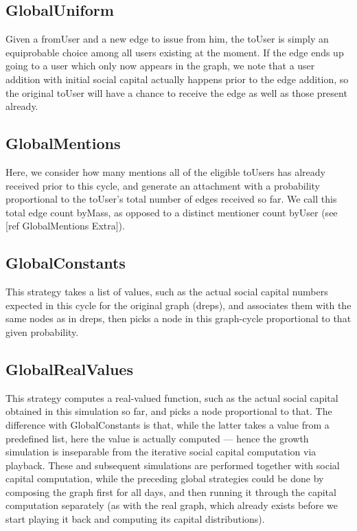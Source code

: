 \documentclass[10pt,oneside]{memoir}
\begin{document}
\subsection{GlobalUniform}
\label{globaluniform}

Given a fromUser and a new edge to issue from him, the toUser is simply an equiprobable choice among all users existing at the moment.  If the edge ends up going to a user which only now appears in the graph, we note that a user addition with initial social capital actually happens prior to the edge addition, so the original toUser will have a chance to receive the edge as well as those present already.


\subsection{GlobalMentions}
\label{globalmentions}

Here, we consider how many mentions all of the eligible toUsers has already received prior to this cycle, and generate an attachment with a probability proportional to the toUser's total number of edges received so far. We call this total edge count byMass, as opposed to a distinct mentioner count byUser (see [ref GlobalMentions Extra]).


\subsection{GlobalConstants}
\label{globalconstants}

This strategy takes a list of values, such as the actual social capital numbers expected in this cycle for the original graph (dreps), and associates them with the same nodes as in dreps, then picks a node in this graph-cycle proportional to that given probability.


\subsection{GlobalRealValues}
\label{globalrealvalues}

This strategy computes a real-valued function, such as the actual social capital obtained in this simulation so far, and picks a node proportional to that.  The difference with GlobalConstants is that, while the latter takes a value from a predefined list, here the value is actually computed --- hence the growth simulation is inseparable from the iterative social capital computation via playback.  These and subsequent simulations are performed together with social capital computation, while the preceding global strategies could be done by composing the graph first for all days, and then running it through the capital computation separately (as with the real graph, which already exists before we start playing it back and computing its capital distributions).
\end{document}
